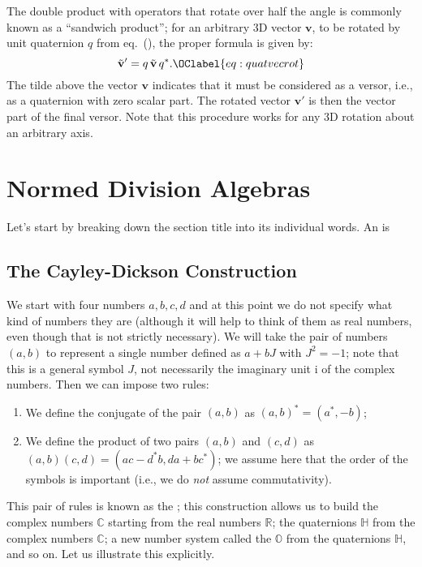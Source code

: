 The double product with operators that rotate over half the angle is commonly known as a ``sandwich product''; for an arbitrary 3D vector $\mathbf{v}$, to be rotated by unit quaternion $q$ from eq.~(), the proper formula is given by:
\begin{equation}
	\tilde{\mathbf{v}}' = q\,\tilde{\mathbf{v}}\,q^{\ast}.\OClabel{eq:quatvecrot}
\end{equation}
The tilde above the vector $\mathbf{v}$ indicates that it must be considered as a versor, i.e., as a quaternion with zero scalar part. The rotated vector $\mathbf{v}'$ is then the vector part of the final versor.  Note that this procedure works for any 3D rotation about an arbitrary axis.



\section{Normed Division Algebras}
Let's start by breaking down the section title into its individual words. An  is 


\subsection{The Cayley-Dickson Construction}


We start with four numbers $a, b, c, d$ and at this point we do not specify what kind of numbers they are (although it will help to think of them as real numbers, even though that is not strictly necessary).  We will take the pair of numbers $(a,b)$ to represent a single number defined as $a+bJ$ with $J^2=-1$; note that this is a general symbol $J$, not necessarily the imaginary unit $\mathrm{i}$ of the complex numbers. Then we can impose two rules:
\begin{enumerate}
\item We define the conjugate of the pair $(a,b)$ as $(a,b)^{\ast}=(a^{\ast},-b)$;
\item We define the product of two pairs $(a,b)$ and $(c,d)$ as 	$(a,b)(c,d)=( ac-d^{\ast}b, da+bc^{\ast} )$; we assume here that the order of the symbols is important (i.e., we do \textit{not} assume commutativity).
\end{enumerate}
This pair of rules is known as the ; this construction allows us to build the complex numbers $\mathbb{C}$ starting from the real numbers $\mathbb{R}$; the quaternions $\mathbb{H}$ from the complex numbers $\mathbb{C}$; a new number system called the  $\mathbb{O}$ from the quaternions $\mathbb{H}$, and so on. Let us illustrate this explicitly.

